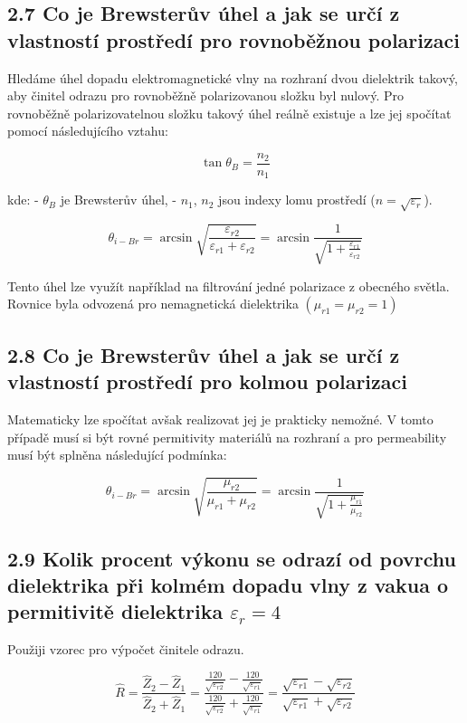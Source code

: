 \documentclass[10pt]{article}
\begin{document}
\subsection*{2.7 Co je Brewsterův úhel a jak se určí z vlastností prostředí pro rovnoběžnou polarizaci}

Hledáme úhel dopadu elektromagnetické vlny na rozhraní dvou dielektrik takový, aby činitel odrazu pro rovnoběžně polarizovanou složku byl nulový. Pro rovnoběžně polarizovatelnou složku takový úhel reálně existuje a lze jej spočítat pomocí následujícího vztahu:

\[
\tan \theta_B = \frac{n_2}{n_1}
\]

kde:
- $\theta_B$ je Brewsterův úhel,
- $n_1$, $n_2$ jsou indexy lomu prostředí ($n = \sqrt{\varepsilon_r}$).


$$
\theta_{i-B r}=\arcsin \sqrt{\frac{\varepsilon_{r 2}}{\varepsilon_{r 1}+\varepsilon_{r 2}}}=\arcsin \frac{1}{\sqrt{1+\frac{\varepsilon_{r 1}}{\varepsilon_{r 2}}}}
$$

Tento úhel lze využít například na filtrování jedné polarizace z obecného světla. Rovnice byla odvozená pro nemagnetická dielektrika $\left(\mu_{r 1}=\mu_{r 2}=1\right)$
\newpage
\subsection*{2.8 Co je Brewsterův úhel a jak se určí z vlastností prostředí pro kolmou polarizaci}
Matematicky lze spočítat avšak realizovat jej je prakticky nemožné. V tomto případě musí si být rovné permitivity materiálů na rozhraní a pro permeability musí být splněna následující podmínka:

$$
\theta_{i-B r}=\arcsin \sqrt{\frac{\mu_{r 2}}{\mu_{r 1}+\mu_{r 2}}}=\arcsin \frac{1}{\sqrt{1+\frac{\mu_{r 1}}{\mu_{r 2}}}}
$$

\subsection*{2.9 Kolik procent výkonu se odrazí od povrchu dielektrika při kolmém dopadu vlny z vakua o permitivitě dielektrika $\varepsilon_{r}=4$}
Použiji vzorec pro výpočet činitele odrazu.

$$
\hat{R}=\frac{\hat{Z}_{2}-\hat{Z}_{1}}{\hat{Z}_{2}+\hat{Z}_{1}}=\frac{\frac{120}{\sqrt{\varepsilon_{r 2}}}-\frac{120}{\sqrt{\varepsilon_{r 1}}}}{\frac{120}{\sqrt{\varepsilon_{r 2}}}+\frac{120}{\sqrt{\varepsilon_{r 1}}}}=\frac{\sqrt{\varepsilon_{r 1}}-\sqrt{\varepsilon_{r 2}}}{\sqrt{\varepsilon_{r 1}}+\sqrt{\varepsilon_{r 2}}}
$$
\end{document}
